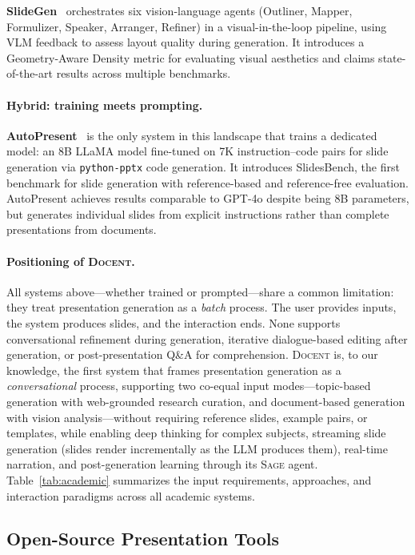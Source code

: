 \documentclass[11pt,a4paper]{article}
\newcommand{\system}{\textsc{Docent}\xspace}
\newcommand{\sage}{\textsc{Sage}\xspace}
\begin{document}
\textbf{SlideGen}~\citep{liang2025slidegen} orchestrates six vision-language agents (Outliner, Mapper, Formulizer, Speaker, Arranger, Refiner) in a visual-in-the-loop pipeline, using VLM feedback to assess layout quality during generation.
It introduces a Geometry-Aware Density metric for evaluating visual aesthetics and claims state-of-the-art results across multiple benchmarks.

\paragraph{Hybrid: training meets prompting.}
\textbf{AutoPresent}~\citep{ge2025autopresent} is the only system in this landscape that trains a dedicated model: an 8B LLaMA model fine-tuned on 7K instruction--code pairs for slide generation via \texttt{python-pptx} code generation.
It introduces SlidesBench, the first benchmark for slide generation with reference-based and reference-free evaluation.
AutoPresent achieves results comparable to GPT-4o despite being 8B parameters, but generates individual slides from explicit instructions rather than complete presentations from documents.

\paragraph{Positioning of \system.}
All systems above---whether trained or prompted---share a common limitation: they treat presentation generation as a \emph{batch} process.
The user provides inputs, the system produces slides, and the interaction ends.
None supports conversational refinement during generation, iterative dialogue-based editing after generation, or post-presentation Q\&A for comprehension.
\system is, to our knowledge, the first system that frames presentation generation as a \emph{conversational} process, supporting two co-equal input modes---topic-based generation with web-grounded research curation, and document-based generation with vision analysis---without requiring reference slides, example pairs, or templates, while enabling deep thinking for complex subjects, streaming slide generation (slides render incrementally as the LLM produces them), real-time narration, and post-generation learning through its \sage agent.
Table~\ref{tab:academic} summarizes the input requirements, approaches, and interaction paradigms across all academic systems.

\subsection{Open-Source Presentation Tools}
\end{document}

